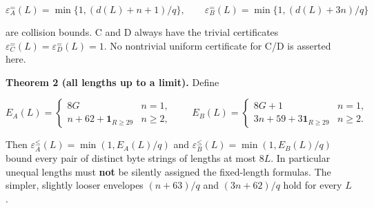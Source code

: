 \documentclass[
  11pt,
]{article}
\begin{document}
\[
 \varepsilon_A^{=}(L)=\min\{1,(d(L)+n+1)/q\},\qquad
 \varepsilon_B^{=}(L)=\min\{1,(d(L)+3n)/q\}
\]

are collision bounds. C and D always have the trivial certificates
\(\varepsilon_C^{=}(L)=\varepsilon_D^{=}(L)=1\). No nontrivial uniform
certificate for C/D is asserted here.

\textbf{Theorem 2 (all lengths up to a limit).} Define

\[
 E_A(L)=\begin{cases}8G&n=1,\\ n+62+\mathbf1_{R\ge29}&n\ge2,\end{cases}
 \qquad
 E_B(L)=\begin{cases}8G+1&n=1,\\3n+59+3\mathbf1_{R\ge29}&n\ge2.\end{cases}
\]

Then \(\varepsilon_A^{\le}(L)=\min(1,E_A(L)/q)\) and
\(\varepsilon_B^{\le}(L)=\min(1,E_B(L)/q)\) bound every pair of distinct
byte strings of lengths at most \(8L\). In particular unequal lengths
must \textbf{not} be silently assigned the fixed-length formulas. The
simpler, slightly looser envelopes \((n+63)/q\) and \((3n+62)/q\) hold
for every \(L\).
\end{document}
